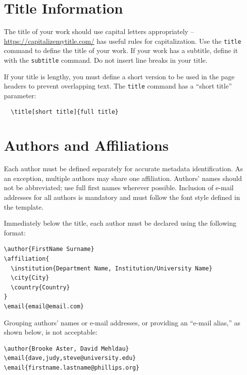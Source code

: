 \documentclass[sigconf]{acmart}
\begin{document}
\section{Title Information}

The title of your work should use capital letters appropriately --\url{https://capitalizemytitle.com/} has useful rules for capitalization. Use the {\verb|title|} command to define the title of your work. If your work has a subtitle, define it with the {\verb|subtitle|} command. Do not insert line breaks in your title.

If your title is lengthy, you must define a short version to be used in the page headers to prevent overlapping text. The \verb|title| command has a ``short title'' parameter:
\begin{verbatim}
  \title[short title]{full title}
\end{verbatim}

\section{Authors and Affiliations}

Each author must be defined separately for accurate metadata
identification. As an exception, multiple authors may share one
affiliation. Authors' names should not be abbreviated; use full first
names wherever possible. Inclusion of e-mail addresses for all authors is mandatory and must follow the font style defined in the template.

Immediately below the title, each author must be declared using the following format:

\begin{center}
\begin{minipage}{\columnwidth}
\small
\begin{verbatim}
\author{FirstName Surname}
\affiliation{
  \institution{Department Name, Institution/University Name}
  \city{City}
  \country{Country}
}
\email{email@email.com}
\end{verbatim}
\end{minipage}
\end{center}

Grouping authors' names or e-mail addresses, or providing an ``e-mail
alias,'' as shown below, is not acceptable:
\begin{verbatim}
\author{Brooke Aster, David Mehldau}
\email{dave,judy,steve@university.edu}
\email{firstname.lastname@phillips.org}
\end{verbatim}
\end{document}
